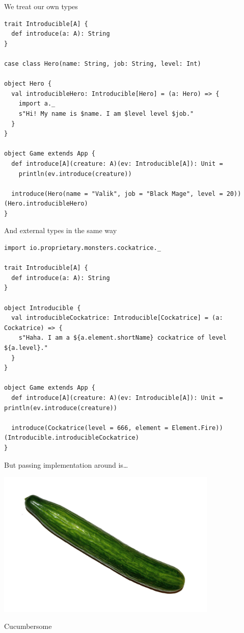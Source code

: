 \documentclass[presentation,aspectratio=169,smaller]{beamer}
\begin{document}
\begin{frame}[label={sec:orgad04d9f},fragile]{We treat our own types}
 \begin{verbatim}
trait Introducible[A] {
  def introduce(a: A): String
}

case class Hero(name: String, job: String, level: Int)

object Hero {
  val introducibleHero: Introducible[Hero] = (a: Hero) => {
    import a._
    s"Hi! My name is $name. I am $level level $job."
  }
}

object Game extends App {
  def introduce[A](creature: A)(ev: Introducible[A]): Unit =
    println(ev.introduce(creature))

  introduce(Hero(name = "Valik", job = "Black Mage", level = 20))(Hero.introducibleHero)
}
\end{verbatim}
\end{frame}

\begin{frame}[label={sec:org1dc9974},fragile]{And external types in the same way}
 \begin{verbatim}
import io.proprietary.monsters.cockatrice._

trait Introducible[A] {
  def introduce(a: A): String
}

object Introducible {
  val introducibleCockatrice: Introducible[Cockatrice] = (a: Cockatrice) => {
    s"Haha. I am a ${a.element.shortName} cockatrice of level ${a.level}."
  }
}

object Game extends App {
  def introduce[A](creature: A)(ev: Introducible[A]): Unit = println(ev.introduce(creature))

  introduce(Cockatrice(level = 666, element = Element.Fire))(Introducible.introducibleCockatrice)
}
\end{verbatim}
\end{frame}

\begin{frame}[label={sec:org500af56}]{But passing implementation around is\ldots{}}
\begin{center}
\includegraphics[height=7cm]{images/cucumber.jpg}
\end{center}

Cucumbersome
\end{frame}
\end{document}
